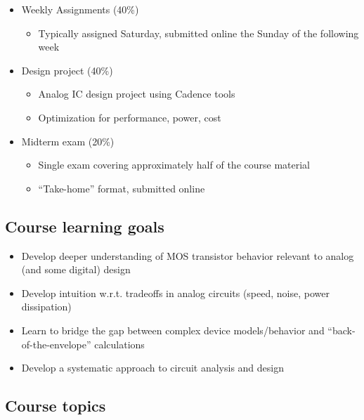 \documentclass[11pt]{article}
\providecommand{\tightlist}{%
      \setlength{\itemsep}{0pt}\setlength{\parskip}{0pt}}
\begin{document}
    \begin{itemize}
\tightlist
\item
  Weekly Assignments (40\%)

  \begin{itemize}
  \tightlist
  \item
    Typically assigned Saturday, submitted online the Sunday of the
    following week
  \end{itemize}
\item
  Design project (40\%)

  \begin{itemize}
  \tightlist
  \item
    Analog IC design project using Cadence tools
  \item
    Optimization for performance, power, cost
  \end{itemize}
\item
  Midterm exam (20\%)

  \begin{itemize}
  \tightlist
  \item
    Single exam covering approximately half of the course material
  \item
    ``Take-home'' format, submitted online
  \end{itemize}
\end{itemize}

    \hypertarget{course-learning-goals}{%
\subsection{Course learning goals}\label{course-learning-goals}}

    \begin{itemize}
\tightlist
\item
  Develop deeper understanding of MOS transistor behavior relevant to
  analog (and some digital) design
\item
  Develop intuition w.r.t. tradeoffs in analog circuits (speed, noise,
  power dissipation)
\item
  Learn to bridge the gap between complex device models/behavior and
  ``back-of-the-envelope'' calculations
\item
  Develop a systematic approach to circuit analysis and design
\end{itemize}

    \hypertarget{course-topics}{%
\subsection{Course topics}\label{course-topics}}
\end{document}
